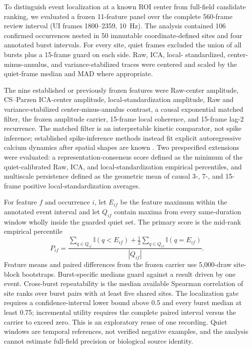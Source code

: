 To distinguish event localization at a known ROI center from full-field
candidate ranking, we evaluated a frozen 11-feature panel over the complete
560-frame review interval (UI frames 1800--2359, 10~Hz). The analysis contained
106 confirmed occurrences nested in 50 immutable coordinate-defined sites and
four annotated burst intervals. For every site, quiet frames excluded the
union of all bursts plus a 15-frame guard on each side. Raw, ICA, local-
standardized, center-minus-annulus, and variance-stabilized traces were centered
and scaled by the quiet-frame median and MAD where appropriate.

The nine established or previously frozen features were Raw-center amplitude,
CS--Parzen ICA-center amplitude, local-standardization amplitude, Raw and
variance-stabilized center-minus-annulus contrast, a causal exponential matched
filter, the frozen amplitude carrier, 15-frame local coherence, and 15-frame
lag-2 recurrence. The matched filter is an interpretable kinetic comparator,
not spike inference; established spike-inference methods instead fit explicit
autoregressive calcium dynamics after spatial shapes are known
\citep{friedrich2017oasis,berens2018benchmarking}. Two prespecified extensions
were evaluated: a representation-consensus score defined as the minimum of the
quiet-calibrated Raw, ICA, and local-standardization empirical percentiles, and
multiscale persistence defined as the geometric mean of causal 3-, 7-, and
15-frame positive local-standardization averages.

For feature $f$ and occurrence $i$, let $E_{if}$ be the feature maximum within
the annotated event interval and let $Q_{if}$ contain maxima from every
same-duration window wholly inside the guarded quiet set. The primary score is
the mid-rank empirical percentile
\begin{equation}
  P_{if}=\frac{\sum_{q\in Q_{if}}\mathbb{I}(q<E_{if})+
  \tfrac{1}{2}\sum_{q\in Q_{if}}\mathbb{I}(q=E_{if})}{|Q_{if}|}.
\end{equation}
Feature means and paired differences from the frozen carrier use 5,000-draw
site-block bootstraps. Burst-specific medians guard against a result driven by
one event. Cross-burst repeatability is the median available Spearman
correlation of site ranks over burst pairs with at least five shared sites.
The localization gate requires a confidence-interval lower bound above 0.5 and
every burst median at least 0.75; incremental utility requires the complete
paired interval versus the carrier to exceed zero. This is an exploratory reuse
of one recording. Quiet windows are temporal references, not verified negative
examples, and the analysis cannot estimate full-field precision or biological
source identity.

